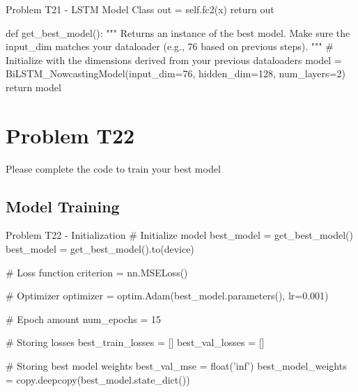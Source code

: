 \documentclass[12pt, a4paper]{article}
\begin{document}
\begin{codeblock}{Problem T21 - LSTM Model Class}
                            out = self.fc2(x)
                            return out

                    def get_best_model():
                        """
                        Returns an instance of the best model.
                        Make sure the input_dim matches your dataloader (e.g., 76 based on previous steps).
                        """
                        # Initialize with the dimensions derived from your previous dataloaders
                        model = BiLSTM_NowcastingModel(input_dim=76, hidden_dim=128, num_layers=2)
                        return model
                \end{codeblock}

	\pagebreak

        \section{Problem T22}
            Please complete the code to train your best model

            \subsection{Model Training}
            \begin{codeblock}{Problem T22 - Initialization}
                # Initialize model
                best_model = get_best_model()
                best_model = get_best_model().to(device)

                # Loss function
                criterion = nn.MSELoss()

                # Optimizer
                optimizer = optim.Adam(best_model.parameters(), lr=0.001)

                # Epoch amount
                num_epochs = 15

                # Storing losses
                best_train_losses = []
                best_val_losses = []

                # Storing best model weights
                best_val_mse = float('inf')
                best_model_weights = copy.deepcopy(best_model.state_dict())
            \end{codeblock}
\end{document}
